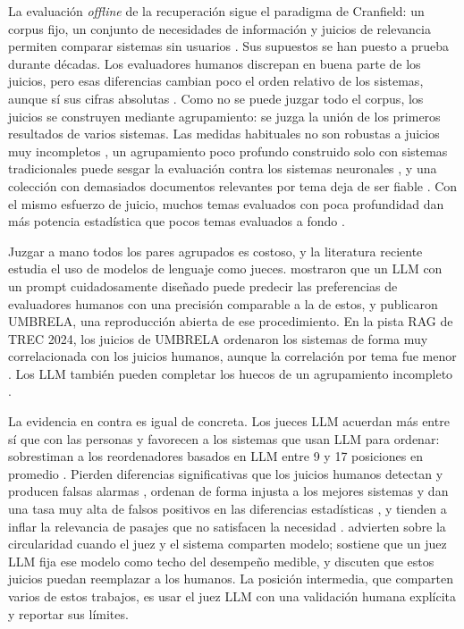 La evaluación \textit{offline} de la recuperación sigue el paradigma de Cranfield: un corpus fijo, un conjunto de necesidades de información y juicios de relevancia permiten comparar sistemas sin usuarios \citep{Sanderson2010}. Sus supuestos se han puesto a prueba durante décadas. Los evaluadores humanos discrepan en buena parte de los juicios, pero esas diferencias cambian poco el orden relativo de los sistemas, aunque sí sus cifras absolutas \citep{Voorhees2000}. Como no se puede juzgar todo el corpus, los juicios se construyen mediante agrupamiento: se juzga la unión de los primeros resultados de varios sistemas. Las medidas habituales no son robustas a juicios muy incompletos \citep{BuckleyVoorhees2004}, un agrupamiento poco profundo construido solo con sistemas tradicionales puede sesgar la evaluación contra los sistemas neuronales \citep{Yilmaz2020}, y una colección con demasiados documentos relevantes por tema deja de ser fiable \citep{Voorhees2022TooMany}. Con el mismo esfuerzo de juicio, muchos temas evaluados con poca profundidad dan más potencia estadística que pocos temas evaluados a fondo \citep{Webber2008}.

Juzgar a mano todos los pares agrupados es costoso, y la literatura reciente estudia el uso de modelos de lenguaje como jueces. \citet{Thomas2024} mostraron que un LLM con un prompt cuidadosamente diseñado puede predecir las preferencias de evaluadores humanos con una precisión comparable a la de estos, y \citet{Upadhyay2024} publicaron UMBRELA, una reproducción abierta de ese procedimiento. En la pista RAG de TREC 2024, los juicios de UMBRELA ordenaron los sistemas de forma muy correlacionada con los juicios humanos, aunque la correlación por tema fue menor \citep{Upadhyay2025}. Los LLM también pueden completar los huecos de un agrupamiento incompleto \citep{Upadhyay2024Holes}.

La evidencia en contra es igual de concreta. Los jueces LLM acuerdan más entre sí que con las personas y favorecen a los sistemas que usan LLM para ordenar: sobrestiman a los reordenadores basados en LLM entre 9 y 17 posiciones en promedio \citep{Frobe2025}. Pierden diferencias significativas que los juicios humanos detectan y producen falsas alarmas \citep{Sakai2025}, ordenan de forma injusta a los mejores sistemas y dan una tasa muy alta de falsos positivos en las diferencias estadísticas \citep{Otero2025}, y tienden a inflar la relevancia de pasajes que no satisfacen la necesidad \citep{Yu2026}. \citet{Faggioli2023} advierten sobre la circularidad cuando el juez y el sistema comparten modelo; \citet{Soboroff2025} sostiene que un juez LLM fija ese modelo como techo del desempeño medible, y \citet{ClarkeDietz2024} discuten que estos juicios puedan reemplazar a los humanos. La posición intermedia, que comparten varios de estos trabajos, es usar el juez LLM con una validación humana explícita y reportar sus límites.

